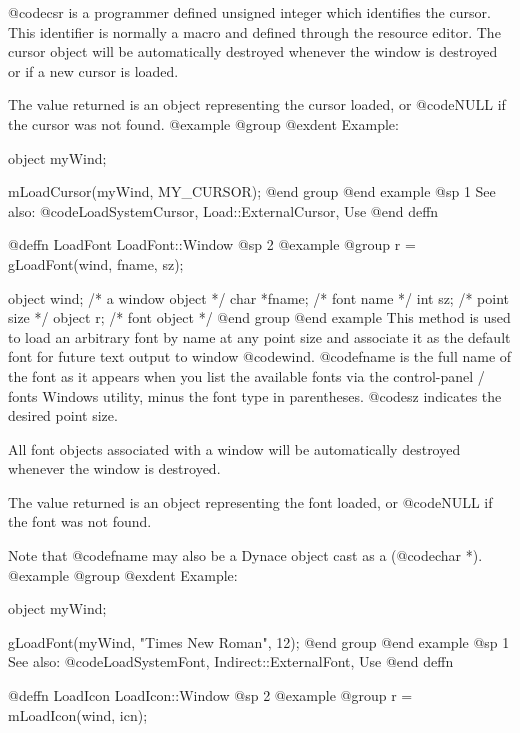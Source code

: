 @code{csr} is a programmer defined unsigned integer which identifies
the cursor.  This identifier is normally a macro and defined through the
resource editor.  The cursor object will be automatically destroyed
whenever the window is destroyed or if a new cursor is loaded.

The value returned is an object representing the cursor loaded, or
@code{NULL} if the cursor was not found.
@example
@group
@exdent Example:

object  myWind;

mLoadCursor(myWind, MY_CURSOR);
@end group
@end example
@sp 1
See also:  @code{LoadSystemCursor, Load::ExternalCursor, Use}
@end deffn











@deffn {LoadFont} LoadFont::Window
@sp 2
@example
@group
r = gLoadFont(wind, fname, sz);

object   wind;  /*  a window object  */
char    *fname; /*  font name        */
int      sz;    /*  point size       */
object   r;     /*  font object      */
@end group
@end example
This method is used to load an arbitrary font by name at any point size
and associate it as the default font for future text output to window
@code{wind}.  @code{fname} is the full name of the font as it appears
when you list the available fonts via the control-panel / fonts Windows
utility, minus the font type in parentheses.  @code{sz} indicates the
desired point size.

All font objects associated with a window will be automatically
destroyed whenever the window is destroyed.

The value returned is an object representing the font loaded, or
@code{NULL} if the font was not found.

Note that @code{fname} may also be a Dynace object cast as a (@code{char *}).
@example
@group
@exdent Example:

object  myWind;

gLoadFont(myWind, "Times New Roman", 12);
@end group
@end example
@sp 1
See also:  @code{LoadSystemFont, Indirect::ExternalFont, Use}
@end deffn









@deffn {LoadIcon} LoadIcon::Window
@sp 2
@example
@group
r = mLoadIcon(wind, icn);

